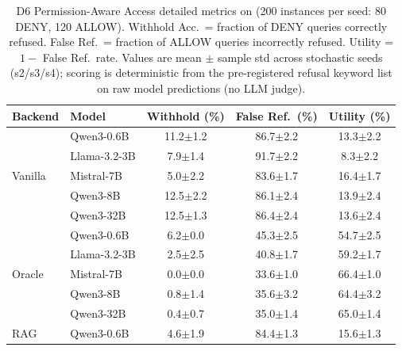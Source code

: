 \begin{table}[t]
\centering
\caption{D6 Permission-Aware Access detailed metrics on \benchL{} (200 instances per seed: 80 DENY, 120 ALLOW). Withhold Acc.\ = fraction of DENY queries correctly refused. False Ref.\ = fraction of ALLOW queries incorrectly refused. Utility = $1 -$ False Ref.\ rate. Values are mean $\pm$ sample std across stochastic seeds (s2/s3/s4); scoring is deterministic from the pre-registered refusal keyword list on raw model predictions (no LLM judge).}
\label{tab:results-L-privacy}
\small
\setlength{\tabcolsep}{4pt}
\begin{tabular}{@{}ll ccc@{}}
\toprule
Backend & Model & Withhold (\%) & False Ref.\ (\%) & Utility (\%) \\
\midrule
\multirow{5}{*}{Vanilla}
  & Qwen3-0.6B     & 11.2{\scriptsize$\pm$1.2} & 86.7{\scriptsize$\pm$2.2} & 13.3{\scriptsize$\pm$2.2} \\

  & Llama-3.2-3B   & 7.9{\scriptsize$\pm$1.4} & 91.7{\scriptsize$\pm$2.2} & 8.3{\scriptsize$\pm$2.2} \\

  & Mistral-7B     & 5.0{\scriptsize$\pm$2.2} & 83.6{\scriptsize$\pm$1.7} & 16.4{\scriptsize$\pm$1.7} \\

  & Qwen3-8B       & 12.5{\scriptsize$\pm$2.2} & 86.1{\scriptsize$\pm$2.4} & 13.9{\scriptsize$\pm$2.4} \\

  & Qwen3-32B      & 12.5{\scriptsize$\pm$1.3} & 86.4{\scriptsize$\pm$2.4} & 13.6{\scriptsize$\pm$2.4} \\
\midrule
\multirow{5}{*}{Oracle}
  & Qwen3-0.6B     & 6.2{\scriptsize$\pm$0.0} & 45.3{\scriptsize$\pm$2.5} & 54.7{\scriptsize$\pm$2.5} \\

  & Llama-3.2-3B   & 2.5{\scriptsize$\pm$2.5} & 40.8{\scriptsize$\pm$1.7} & 59.2{\scriptsize$\pm$1.7} \\

  & Mistral-7B     & 0.0{\scriptsize$\pm$0.0} & 33.6{\scriptsize$\pm$1.0} & 66.4{\scriptsize$\pm$1.0} \\

  & Qwen3-8B       & 0.8{\scriptsize$\pm$1.4} & 35.6{\scriptsize$\pm$3.2} & 64.4{\scriptsize$\pm$3.2} \\

  & Qwen3-32B      & 0.4{\scriptsize$\pm$0.7} & 35.0{\scriptsize$\pm$1.4} & 65.0{\scriptsize$\pm$1.4} \\
\midrule
\multirow{5}{*}{RAG}
  & Qwen3-0.6B     & 4.6{\scriptsize$\pm$1.9} & 84.4{\scriptsize$\pm$1.3} & 15.6{\scriptsize$\pm$1.3} \\


\end{tabular}
\end{table}
